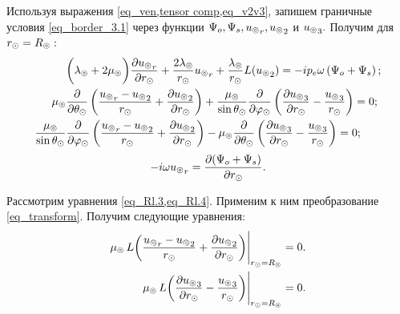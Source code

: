 Используя выражения \cref{eq_ven,tensor comp,eq_v2v3}, запишем граничные условия \cref{eq_border_3.1} через функции $\P\o, \P\sc, {u\l}_r, {u\l}_2$ и ${u\l}_3.$ Получим для $r\s = R\l:$
\begin{align}
&\biggl(\la\l+2\mu\l\biggr)\fr{\de {u\l}_r}{\de r\s} + \fr{2\la\l}{r\s}{u\l}_r + \fr{\la\l}{r\s}L({u\l}_2) = -ip\en\om\left(\P\o+\P\sc\right);\label{eq_Rl.2}\\
\mu\l&\fr{\de}{\de \Q\s}\left(\fr{{u\l}_r-{u\l}_2}{r\s} + \fr{\de {u\l}_2}{\de r\s}\right) + \fr{\mu\l}{\sin\Q\s}\fr{\de}{\de \f\s}\left(\fr{\de {u\l}_3}{\de r\s} - \fr{{u\l}_3}{r\s}\right) = 0;\label{eq_Rl.3}\\
\fr{\mu\l}{\sin\Q\s}&\fr{\de}{\de \f\s}\left(\fr{{u\l}_r-{u\l}_2}{r\s} + \fr{\de {u\l}_2}{\de r\s}\right) - \mu\l\fr{\de}{\de \Q\s}\left(\fr{\de {u\l}_3}{\de r\s} - \fr{{u\l}_3}{r\s}\right) = 0;\label{eq_Rl.4}
\end{align}
\begin{equation}\label{eq_Rl.1}
-i\om{u\l}_r = \fr{\de(\P\o+\P\sc)}{\de r\s} .
\end{equation}


Рассмотрим уравнения \cref{eq_Rl.3,eq_Rl.4}. Применим к ним преобразование \cref{eq_transform}. Получим следующие уравнения:
\begin{align}
\mu\l \,L\!\left(\fr{{u\l}_r-{u\l}_2}{r\s} + \fr{\de {u\l}_2}{\de r\s}\right)&\Biggr|_{r\s = R\l} = 0.\label{eq_Rl.3a}\\
\mu\l \,L\!\left(\fr{\de {u\l}_3}{\de r\s} - \fr{{u\l}_3}{r\s}\right)&\Biggr|_{r\s = R\l} = 0.\label{eq_Rl.4a}
\end{align}


